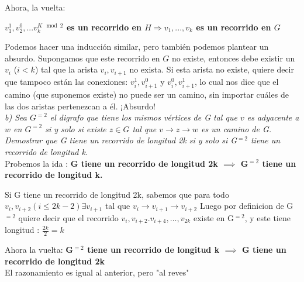 \documentclass{article}
\begin{document}
Ahora, la vuelta:

\textbf{$v^1_1,v^0_2,...v^{K \mod 2}_k$ es un recorrido en $H \Rightarrow v_1,...,v_k$ es un recorrido en $G$ }

Podemos hacer una inducción similar, pero también podemos plantear un absurdo. Supongamos que este recorrido en $G$ no existe, entonces debe existir un $v_i$ ($i < k$) tal que la arista $v_i,v_{i+1}$ no exista. Si esta arista no existe, quiere decir que tampoco están las conexiones: $v^1_i,v^0_{i + 1}$ y $v^0_i,v^1_{i + 1}$, lo cual nos dice que el camino (que suponemos existe) no puede ser un camino, sin importar cuáles de las dos aristas pertenezcan a él. ¡Absurdo!\\

{\textit{b) Sea $G^{=2}$ el digrafo que tiene los mismos vértices de G tal que $v$ es adyacente a $w$ en $G^{=2}$ si
y solo si existe $z \in G$ tal que $v \rightarrow z \rightarrow w$ es un camino de G. Demostrar que G tiene un
recorrido de longitud 2k si y solo si G$^{=2}$ tiene un recorrido de longitud k.}} \\

Probemos la ida : 
\textbf{G tiene un
recorrido de longitud 2k $\implies$ G$^{=2}$ tiene un recorrido de longitud k.}

Si G tiene un recorrido de longitud 2k, sabemos que para todo $v_i,v_{i+2}(i \le 2k - 2) \exists v_{i+1}$ tal que  $v_i \rightarrow v_{i+1} \rightarrow v_{i+2}$ Luego por definicion de G$^{=2}$  quiere decir que el recorrido 
$v_i,v_{i+2}.v_{i+4},\dots ,v_{2k}$ existe en G$^{=2}$, y este tiene longitud : $\frac{2k}{2} = k$ 

Ahora la vuelta:
\textbf{ G$^{=2}$ tiene un recorrido de longitud k $\implies$ G tiene un
recorrido de longitud 2k } \\
El razonamiento es igual al anterior, pero "al reves"
\end{document}
